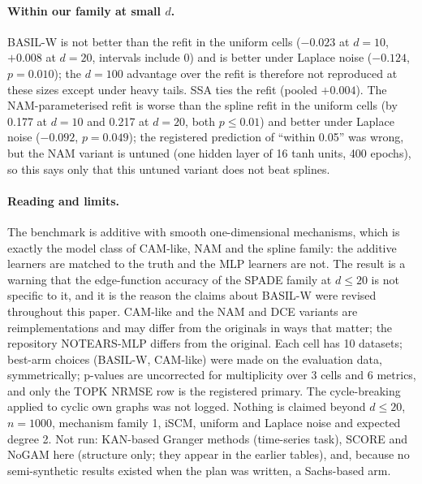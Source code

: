 \paragraph{Within our family at small $d$.} BASIL-W is not better than the refit in the uniform cells ($-0.023$ at $d=10$, $+0.008$ at $d=20$, intervals include 0) and is better under Laplace noise ($-0.124$, $p=0.010$); the $d=100$ advantage over the refit is therefore not reproduced at these sizes except under heavy tails. SSA ties the refit (pooled $+0.004$). The NAM-parameterised refit is worse than the spline refit in the uniform cells (by 0.177 at $d=10$ and 0.217 at $d=20$, both $p\le0.01$) and better under Laplace noise ($-0.092$, $p=0.049$); the registered prediction of ``within 0.05'' was wrong, but the NAM variant is untuned (one hidden layer of 16 tanh units, 400 epochs), so this says only that this untuned variant does not beat splines.

\paragraph{Reading and limits.} The benchmark is additive with smooth one-dimensional mechanisms, which is exactly the model class of CAM-like, NAM and the spline family: the additive learners are matched to the truth and the MLP learners are not. The result is a warning that the edge-function accuracy of the SPADE family at $d\le20$ is not specific to it, and it is the reason the claims about BASIL-W were revised throughout this paper. CAM-like and the NAM and DCE variants are reimplementations and may differ from the originals in ways that matter; the repository NOTEARS-MLP differs from the original. Each cell has 10 datasets; best-arm choices (BASIL-W, CAM-like) were made on the evaluation data, symmetrically; p-values are uncorrected for multiplicity over 3 cells and 6 metrics, and only the TOPK NRMSE row is the registered primary. The cycle-breaking applied to cyclic own graphs was not logged. Nothing is claimed beyond $d\le20$, $n=1000$, mechanism family 1, iSCM, uniform and Laplace noise and expected degree 2. Not run: KAN-based Granger methods (time-series task), SCORE and NoGAM here (structure only; they appear in the earlier tables), and, because no semi-synthetic results existed when the plan was written, a Sachs-based arm.
